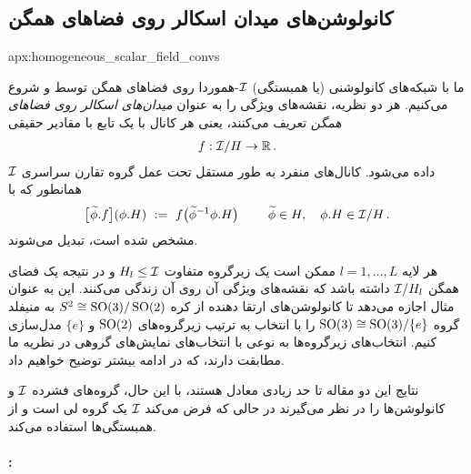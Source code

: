 \toclesslab\subsection{کانولوشن‌های میدان اسکالر روی فضاهای همگن}{apx:homogeneous_scalar_field_convs}

ما با شبکه‌های کانولوشنی (یا همبستگی) $\mathcal{I}$-هموردا روی فضاهای همگن توسط \citet{Kondor2018-GENERAL} و \citet{bekkers2020bspline} شروع می‌کنیم.
هر دو نظریه، نقشه‌های ویژگی را به عنوان \emph{میدان‌های اسکالر روی فضاهای همگن} تعریف می‌کنند، یعنی هر کانال با یک تابع با مقادیر حقیقی
\begin{align}\label{eq:scalar_field_homogeneous_space}
	f: \mathcal{I}/H \to \mathbb{R} \,.
\end{align}
داده می‌شود. کانال‌های منفرد به طور مستقل تحت عمل گروه تقارن سراسری $\mathcal{I}$ همانطور که با
\begin{align}\label{eq:group_action_homogeneous_space_scalar_field}
	\big[\mkern1mu \widetilde{\phi}.f\big] (\phi.H)\ :=\ f\big( \widetilde{\phi}^{-1} \phi.H \big)
	\qquad\ \widetilde{\phi}\in H,\ \ \ \phi.H\in \mathcal{I}/H \,.
\end{align}
مشخص شده است، تبدیل می‌شوند.

هر لایه $l = 1,\dots, L$ ممکن است یک زیرگروه متفاوت $H_l \leq\mathcal{I}$ و در نتیجه یک فضای همگن $\mathcal{I}/H_l$ داشته باشد که نقشه‌های ویژگی آن روی آن زندگی می‌کنند.
این به عنوان مثال اجازه می‌دهد تا کانولوشن‌های ارتقا دهنده از کره $S^2 \cong \operatorname{SO}(3)/\operatorname{SO}(2)$ به منیفلد گروه $\operatorname{SO}(3) \cong \operatorname{SO}(3)/\{e\}$ را با انتخاب به ترتیب زیرگروه‌های $\operatorname{SO}(2)$ و $\{e\}$ مدل‌سازی کنیم.
انتخاب‌های زیرگروه‌ها به نوعی با انتخاب‌های نمایش‌های گروهی در نظریه ما مطابقت دارند، که در ادامه بیشتر توضیح خواهیم داد.

نتایج این دو مقاله تا حد زیادی معادل هستند، با این حال،
\citet{Kondor2018-GENERAL} گروه‌های فشرده $\mathcal{I}$ و کانولوشن‌ها را در نظر می‌گیرند
در حالی که \citet{bekkers2020bspline} فرض می‌کند $\mathcal{I}$ یک گروه لی است و از همبستگی‌ها استفاده می‌کند.



\paragraph{\citet{Kondor2018-GENERAL}:}

